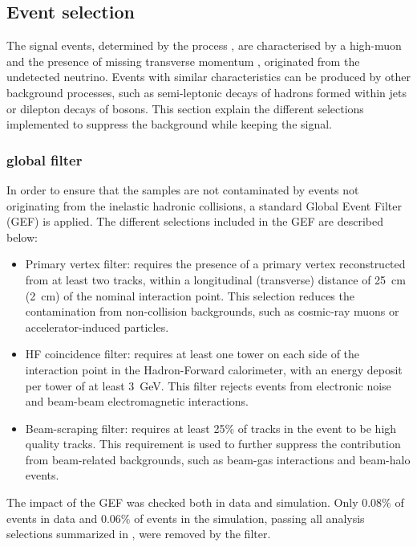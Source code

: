 \subsection{Event selection} \label{sec:WBoson_Analysis_Selection}


The signal events, determined by the process \WToMuNu, are characterised by a high-\pt muon and the presence of missing transverse momentum \ptmiss, originated from the undetected neutrino. Events with similar characteristics can be produced by other background processes, such as semi-leptonic decays of hadrons formed within jets or dilepton decays of \Z bosons. This section explain the different selections implemented to suppress the background while keeping the signal.

\subsubsection{\RunpPb global filter} \label{sec:WBoson_Analysis_Selection_EventFilter}

In order to ensure that the samples are not contaminated by events not originating from the inelastic hadronic collisions, a standard \RunpPb Global Event Filter (GEF) is applied. The different selections included in the \RunpPb GEF are described below:

\begin{itemize}
 \item Primary vertex filter: requires the presence of a primary vertex reconstructed from at least two tracks, within a longitudinal (transverse) distance of \SI{25}{\cm} (\SI{2}{\cm}) of the nominal interaction point. This selection reduces the contamination from non-collision backgrounds, such as cosmic-ray muons or accelerator-induced particles.
 \item HF coincidence filter: requires at least one tower on each side of the interaction point in the Hadron-Forward calorimeter, with an energy deposit per tower of at least \SI{3}{\GeV}. This filter rejects events from  electronic noise and beam-beam electromagnetic interactions.
 \item Beam-scraping filter: requires at least 25$\%$ of tracks in the event to be high quality tracks. This requirement is used to further suppress the contribution from beam-related backgrounds, such as beam-gas interactions and beam-halo events.
\end{itemize}

The impact of the GEF was checked both in data and simulation. Only 0.08$\%$ of events in data and 0.06$\%$ of events in the \WToMuNu simulation, passing all analysis selections summarized in , were removed by the filter.


